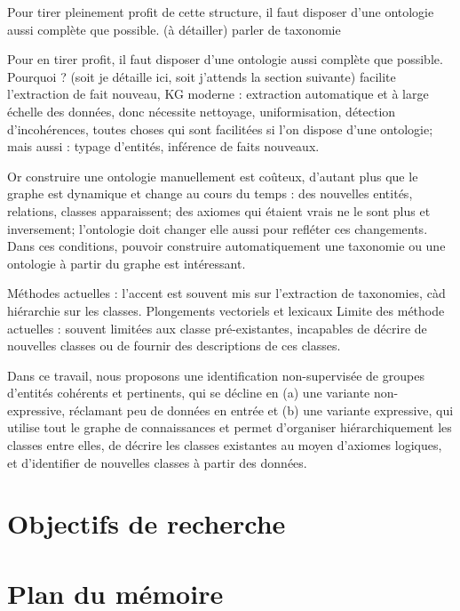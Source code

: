 Pour tirer pleinement profit de cette structure, il faut disposer d'une ontologie aussi complète que possible. (à détailler) parler de taxonomie

Pour en tirer profit, il faut disposer d'une ontologie aussi complète que possible. Pourquoi ? (soit je détaille ici, soit j'attends la section suivante) facilite l'extraction de fait nouveau, KG moderne : extraction automatique et à large échelle des données, donc nécessite nettoyage, uniformisation, détection d'incohérences, toutes choses qui sont facilitées si l'on dispose d'une ontologie; mais aussi : typage d'entités, inférence de faits nouveaux.

Or construire une ontologie manuellement est coûteux, d'autant plus que le graphe est dynamique et change au cours du temps : des nouvelles entités, relations, classes apparaissent; des axiomes qui étaient vrais ne le sont plus et inversement; l'ontologie doit changer elle aussi pour refléter ces changements. Dans ces conditions, pouvoir construire automatiquement une taxonomie ou une ontologie à partir du graphe est intéressant.


Méthodes actuelles : l'accent est souvent mis sur l'extraction de taxonomies, càd hiérarchie sur les classes. Plongements vectoriels et lexicaux 
Limite des méthode actuelles : souvent limitées aux classe pré-existantes, incapables de décrire de nouvelles classes ou de fournir des descriptions de ces classes.

Dans ce travail, nous proposons une identification non-supervisée de groupes d'entités cohérents et pertinents, qui se décline en (a) une variante non-expressive, réclamant peu de données en entrée et (b) une variante expressive, qui utilise tout le graphe de connaissances et permet d'organiser hiérarchiquement les classes entre elles, de décrire les classes existantes au moyen d'axiomes logiques, et d'identifier de nouvelles classes à partir des données.







\section{Objectifs de recherche}  %


\section{Plan du mémoire}  %


